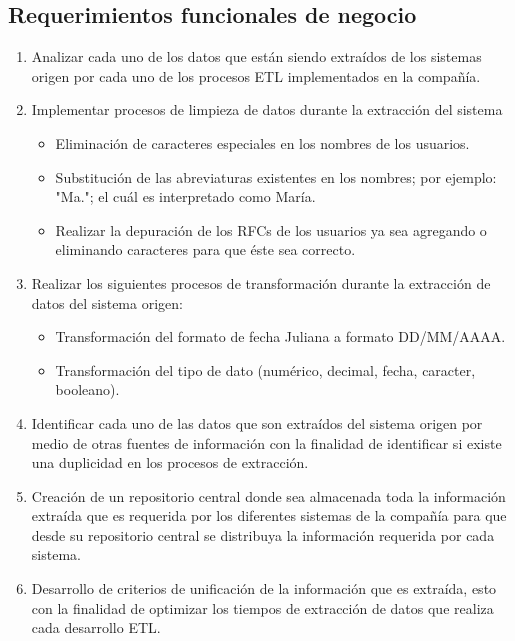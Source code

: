 \subsection{Requerimientos funcionales de negocio}

\begin{enumerate}

\item Analizar cada uno de los datos que están siendo extraídos de los sistemas
  origen por cada uno de los procesos ETL implementados en la compañía.

\item Implementar procesos de limpieza de datos durante la extracción del
  sistema

  \begin {itemize}
  \item Eliminación de caracteres especiales en los nombres de los usuarios.
  \item Substitución de las abreviaturas existentes en los nombres; por ejemplo:
    "Ma."; el cuál es interpretado como María.
  \item Realizar la depuración de los RFCs de los usuarios ya sea agregando o
    eliminando caracteres para que éste sea correcto.
  \end{itemize}

\item Realizar los siguientes procesos de transformación durante la extracción
  de datos del sistema origen:

  \begin {itemize}
  \item Transformación del formato de fecha Juliana a formato DD/MM/AAAA.
  \item Transformación del tipo de dato (numérico, decimal, fecha, caracter,
    booleano).
  \end{itemize}

\item Identificar cada uno de las datos que son extraídos del sistema origen por
  medio de otras fuentes de información con la finalidad de identificar si
  existe una duplicidad en los procesos de extracción.

\item Creación de un repositorio central donde sea almacenada toda la
  información extraída que es requerida por los diferentes sistemas de la
  compañía para que desde su repositorio central se distribuya la información
  requerida por cada sistema.

\item Desarrollo de criterios de unificación de la información que es extraída,
  esto con la finalidad de optimizar los tiempos de extracción de datos que
  realiza cada desarrollo ETL.


\end{enumerate}

